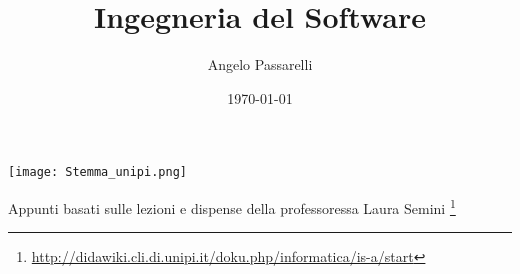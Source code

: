 \documentclass{article}
\title{Ingegneria del Software}
\author{Angelo Passarelli}
\date{\today}
\begin{document}
    
    \maketitle
    \begin{center}
        \texttt{[image: Stemma\_unipi.png]}
    \end{center}
    \vspace{1cm}
    \begin{center}
        Appunti basati sulle lezioni e dispense della professoressa Laura Semini \footnote{\url{http://didawiki.cli.di.unipi.it/doku.php/informatica/is-a/start}}
    \end{center}
    \pagebreak
    \tableofcontents
    \pagebreak

    \begin{sloppypar}
        
        
        
    \end{sloppypar}
\end{document}
